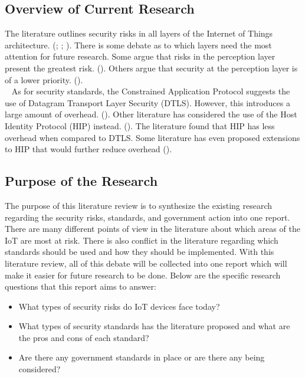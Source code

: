 \documentclass[letterpaper, 12pt]{article}
\begin{document}
\begin{flushleft}
\subsection*{Overview of Current Research}
The literature outlines security risks in all layers of the Internet of Things architecture. (\cite{Xiaohui6643029}; \cite{Zhao6746513}; \cite{Suo6188257}). 
There is some debate as to which layers need the most attention for future research. Some argue that risks in the perception layer present the greatest risk. (\cite{Zhao6746513}).
Others argue that security at the perception layer is of a lower priority. (\cite{Kozlov}). \\
~\newline
As for security standards, the Constrained Application Protocol suggests the use of Datagram Transport Layer Security (DTLS). However, this introduces a large amount of overhead. (\cite{Capossele}).  
Other literature has considered the use of the Host Identity Protocol (HIP) instead. (\cite{Garcia-Morchon:2013:SII:2462096.2462117}). The literature found that HIP has less overhead when compared to
DTLS. Some literature has even proposed extensions to HIP that would further reduce overhead (\cite{Hummen}).

\subsection*{Purpose of the Research}
The purpose of this literature review is to synthesize the existing research regarding the security risks, standards, and government action into one report. There are many different points of view in the
literature about which areas of the IoT are most at risk. There is also conflict in the literature regarding which standards should be used and how they should be implemented. With this literature review,
all of this debate will be collected into one report which will make it easier for future research to be done. Below are the specific research questions
that this report aims to answer:

\begin{itemize}
\item What types of security risks do IoT devices face today?
\item What types of security standards has the literature proposed and what are the pros and cons of each standard?
\item Are there any government standards in place or are there any being considered?
\end{itemize}


\end{flushleft}
\end{document}
